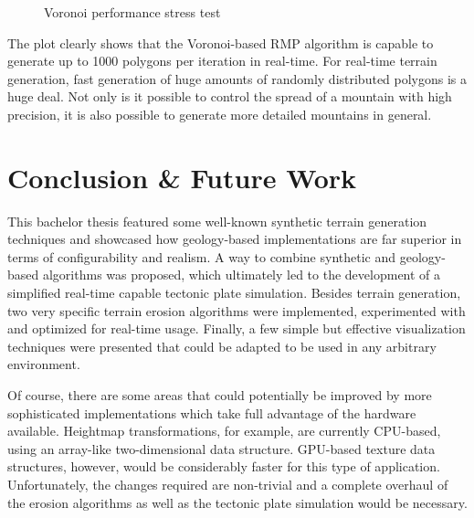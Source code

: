 \documentclass[11pt,a4paper,twoside,openright]{report}
\begin{document}
\begin{figure}[h]
\centering
{}
\caption{Voronoi performance stress test}
\label{fig:voronoiperformancestresstest}
\end{figure}

\noindent The plot clearly shows that the Voronoi-based RMP algorithm is capable to generate up to 1000 polygons per iteration in real-time. For real-time terrain generation, fast generation of huge amounts of randomly distributed polygons is a huge deal. Not only is it possible to control the spread of a mountain with high precision, it is also possible to generate more detailed mountains in general.

\chapter{Conclusion \& Future Work}
\label{sec:concl}
This bachelor thesis featured some well-known synthetic terrain generation techniques and showcased how geology-based implementations are far superior in terms of configurability and realism. A way to combine synthetic and geology-based algorithms was proposed, which ultimately led to the development of a simplified real-time capable tectonic plate simulation. Besides terrain generation, two very specific terrain erosion algorithms were implemented, experimented with and optimized for real-time usage. Finally, a few simple but effective visualization techniques were presented that could be adapted to be used in any arbitrary environment.

Of course, there are some areas that could potentially be improved by more sophisticated implementations which take full advantage of the hardware available. Heightmap transformations, for example, are currently CPU-based, using an array-like two-dimensional data structure. GPU-based texture data structures, however, would be considerably faster for this type of application. Unfortunately, the changes required are non-trivial and a complete overhaul of the erosion algorithms as well as the tectonic plate simulation would be necessary.
\end{document}
